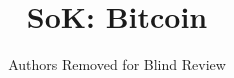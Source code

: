 \documentclass[conference]{IEEEtran}
\begin{document}
%
\title{SoK: Bitcoin}


\author{Authors Removed for Blind Review}


% 
\end{document}
